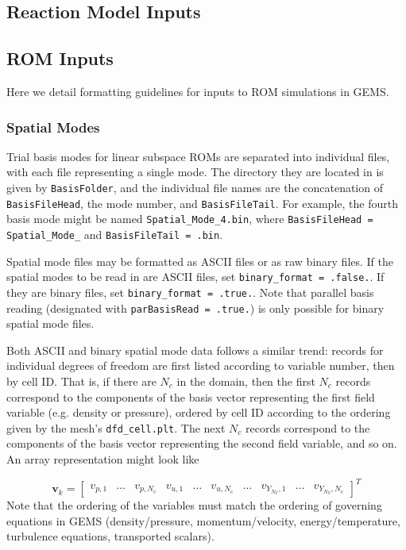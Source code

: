 \subsection{Reaction Model Inputs}

\subsection{ROM Inputs}

Here we detail formatting guidelines for inputs to ROM simulations in GEMS.  

\subsubsection{Spatial Modes}

Trial basis modes for linear subspace ROMs are separated into individual files, with each file representing a single mode. The directory they are located in is given by \verb|BasisFolder|, and the individual file names are the concatenation of \verb|BasisFileHead|, the mode number, and \verb|BasisFileTail|. For example, the fourth basis mode might be named \verb|Spatial_Mode_4.bin|, where \verb|BasisFileHead = Spatial_Mode_| and \verb|BasisFileTail = .bin|.

Spatial mode files may be formatted as ASCII files or as raw binary files. If the spatial modes to be read in are ASCII files, set \verb|binary_format = .false.|. If they are binary files, set \verb|binary_format = .true.|. Note that parallel basis reading (designated with \verb|parBasisRead = .true.|) is only possible for binary spatial mode files.

Both ASCII and binary spatial mode data follows a similar trend: records for individual degrees of freedom are first listed according to variable number, then by cell ID. That is, if there are $N_c$ in the domain, then the first $N_c$ records correspond to the components of the basis vector representing the first field variable (e.g. density or pressure), ordered by cell ID according to the ordering given by the mesh's \verb|dfd_cell.plt|. The next $N_c$ records correspond to the components of the basis vector representing the second field variable, and so on. An array representation might look like

\begin{equation*}
    \mathbf{v}_k = 
    \begin{bmatrix}
        v_{p,1} & \hdots & v_{p, N_c} & v_{u, 1} & \hdots & v_{u, N_c} & \hdots & v_{Y_{N_Y}, 1} & \hdots & v_{Y_{N_Y}, N_c} 
    \end{bmatrix}^T
\end{equation*}
Note that the ordering of the variables must match the ordering of governing equations in GEMS (density/pressure, momentum/velocity, energy/temperature, turbulence equations, transported scalars).

